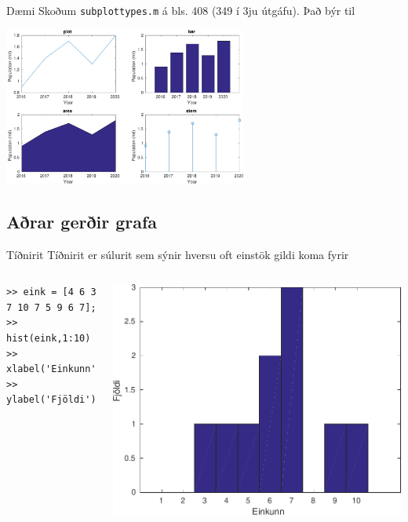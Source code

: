 \documentclass{beamer}
\begin{document}
\begin{frame}{Dæmi}
\vspace{1cm}
Skoðum \texttt{subplottypes.m} á bls. 408 (349 í 3ju útgáfu). Það býr til

\begin{center}
\includegraphics[width=0.6\textwidth]{../Pics/plottypes.pdf}
\end{center}
\end{frame}

\subsection{Aðrar gerðir grafa}

\begin{frame}[fragile]{Tíðnirit}
Tíðnirit er súlurit sem sýnir hversu oft einstök gildi koma fyrir
\begin{columns}
\begin{verbatim}
>> eink = [4 6 3 7 10 7 5 9 6 7];
>> hist(eink,1:10)
>> xlabel('Einkunn')
>> ylabel('Fjöldi')
\end{verbatim}

\includegraphics[width=\linewidth]{../Pics/hist}
\end{columns}

\end{frame}
\end{document}
